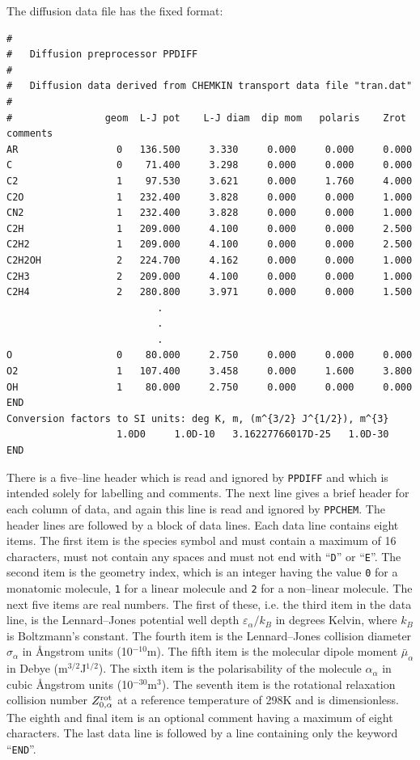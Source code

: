 \documentclass[dvips]{article}
\begin{document}
\noindent
The diffusion data file has the fixed format:
\begin{verbatim}
#
#   Diffusion preprocessor PPDIFF
#
#   Diffusion data derived from CHEMKIN transport data file "tran.dat"
#
#                geom  L-J pot    L-J diam  dip mom   polaris    Zrot  comments
AR                 0   136.500     3.330     0.000     0.000     0.000
C                  0    71.400     3.298     0.000     0.000     0.000 
C2                 1    97.530     3.621     0.000     1.760     4.000
C2O                1   232.400     3.828     0.000     0.000     1.000
CN2                1   232.400     3.828     0.000     0.000     1.000
C2H                1   209.000     4.100     0.000     0.000     2.500
C2H2               1   209.000     4.100     0.000     0.000     2.500
C2H2OH             2   224.700     4.162     0.000     0.000     1.000
C2H3               2   209.000     4.100     0.000     0.000     1.000
C2H4               2   280.800     3.971     0.000     0.000     1.500
                          .
                          .
                          .
O                  0    80.000     2.750     0.000     0.000     0.000
O2                 1   107.400     3.458     0.000     1.600     3.800
OH                 1    80.000     2.750     0.000     0.000     0.000
END
Conversion factors to SI units: deg K, m, (m^{3/2} J^{1/2}), m^{3}
                   1.0D0     1.0D-10   3.16227766017D-25   1.0D-30
END
\end{verbatim}
There is a five--line header which is read and ignored by {\tt PPDIFF} and
which is intended solely for labelling and comments.  The next line gives a 
brief header for each column of data, and again this line is read and
ignored by {\tt PPCHEM}.  The header lines are followed by a block of data
lines.  Each data line contains eight items.  The first item is the
species symbol and must contain a maximum of 16 characters, must not
contain any spaces and must not end with ``{\tt D}'' or ``{\tt E}''.
The second item is the geometry index, which is an integer having the
value {\tt 0} for a monatomic molecule, {\tt 1} for a linear molecule
and {\tt 2} for a non--linear molecule.  The next five items are real
numbers.  The first of these, i.e. the third item in the data line, is the
Lennard--Jones potential well depth $\varepsilon_{\alpha}/k_{B}$ in degrees
Kelvin, where $k_{B}$ is Boltzmann's constant.  The fourth item is the
Lennard--Jones collision diameter
$\sigma_{\alpha}$ in \AA ngstrom units (10$^{-10}$m).  The fifth item is the
molecular dipole moment $\bar{\mu}_{\alpha}$ in Debye (m$^{3/2}$J$^{1/2}$).
The sixth item is the polarisability of the molecule $\alpha_{\alpha}$ in
cubic \AA ngstrom units (10$^{-30}$m$^{3}$).  The seventh item is the
rotational relaxation collision number $Z_{0,\alpha}^{\rm rot}$ at a
reference temperature of 298K and is dimensionless.  The eighth
and final item is an optional comment having a maximum of eight
characters.
The last data line is followed by a line containing only the keyword
``{\tt END}''.
\end{document}
